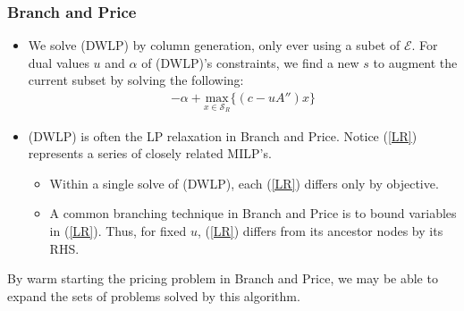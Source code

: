\documentclass{beamer}
\begin{document}
	\begin{frame}[t]
		\frametitle{Branch and Price}
		\small
		\vspace{0cm}
		\begin{itemize}
			\item We solve (DWLP) by column generation, only ever using a subet of $ \mathcal{E} $. For dual values $ u $ and $ \alpha $ of (DWLP)'s constraints, we find a new $ s $ to augment the current subset by solving the following:
			\begin{align}
				-\alpha + \underset{x \in \mathcal{S}_R}{\text{max}} \{(c-uA'')x\} \label{LR} \tag{LR($ u $)}
			\end{align}
			\item (DWLP) is often the LP relaxation in Branch and Price. Notice (\ref{LR}) represents a series of closely related MILP's.
			\begin{itemize}
				\item Within a single solve of (DWLP), each (\ref{LR}) differs only by objective.
				\item A common branching technique in Branch and Price is to bound variables in (\ref{LR}). Thus, for fixed $ u $, (\ref{LR}) differs from its ancestor nodes by its RHS.
			\end{itemize}
		\end{itemize}
		\vspace{0cm}
		\begin{block}{}
			By warm starting the pricing problem in Branch and Price, we may be able to expand the sets of problems solved by this algorithm.
		\end{block}
		\normalsize
	\end{frame}
	
\end{document}
